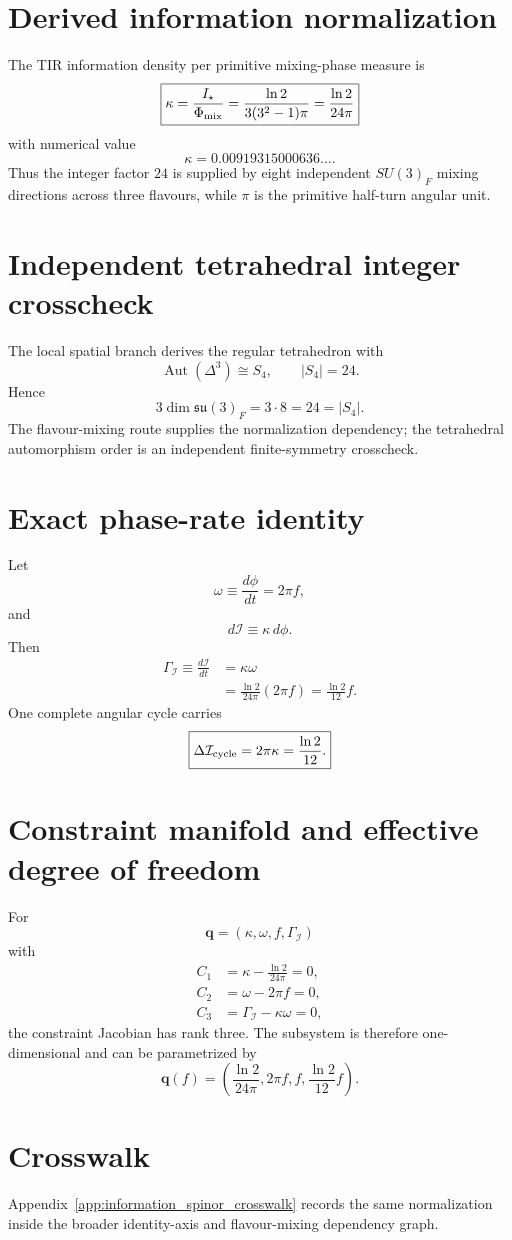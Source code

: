 \section{Derived information normalization}
The TIR information density per primitive mixing-phase measure is
\[
\boxed{
\kappa
=\frac{I_\star}{\Phi_{\rm mix}}
=\frac{\ln2}{3(3^2-1)\pi}
=\frac{\ln2}{24\pi}
}
\]
with numerical value
\[
\kappa=0.00919315000636\ldots .
\]
Thus the integer factor $24$ is supplied by eight independent $SU(3)_F$ mixing
directions across three flavours, while $\pi$ is the primitive half-turn angular
unit.

\section{Independent tetrahedral integer crosscheck}
The local spatial branch derives the regular tetrahedron with
\[
\operatorname{Aut}(\Delta^3)\cong S_4,
\qquad
|S_4|=24.
\]
Hence
\[
\boxed{
3\dim\mathfrak{su}(3)_F
=3\cdot8
=24
=|S_4|.
}
\]
The flavour-mixing route supplies the normalization dependency; the tetrahedral
automorphism order is an independent finite-symmetry crosscheck.

\section{Exact phase-rate identity}
\label{app:kappa-phase-rate}
Let
\begin{equation}
\omega\equiv\frac{d\phi}{dt}=2\pi f,
\label{eq:kappa-omega-frequency}
\end{equation}
and
\begin{equation}
d\mathcal I\equiv\kappa\,d\phi.
\label{eq:kappa-information-phase-increment}
\end{equation}
Then
\begin{align}
\Gamma_{\mathcal I}
\equiv\frac{d\mathcal I}{dt}
&=\kappa\omega\\
&=\frac{\ln2}{24\pi}(2\pi f)
=\boxed{\frac{\ln2}{12}f}.
\label{eq:kappa-phase-refresh-identity}
\end{align}
One complete angular cycle carries
\begin{equation}
\boxed{
\Delta\mathcal I_{\rm cycle}
=2\pi\kappa
=\frac{\ln2}{12}.
}
\label{eq:kappa-information-per-cycle}
\end{equation}

\section{Constraint manifold and effective degree of freedom}
\label{app:kappa-constraint-manifold}
For
\[
\mathbf q=(\kappa,\omega,f,\Gamma_{\mathcal I})
\]
with
\begin{align}
C_1&=\kappa-\frac{\ln2}{24\pi}=0,\\
C_2&=\omega-2\pi f=0,\\
C_3&=\Gamma_{\mathcal I}-\kappa\omega=0,
\end{align}
the constraint Jacobian has rank three. The subsystem is therefore
one-dimensional and can be parametrized by
\[
\boxed{
\mathbf q(f)=
\left(
\frac{\ln2}{24\pi},
2\pi f,
f,
\frac{\ln2}{12}f
\right).
}
\]

\section{Crosswalk}
Appendix~\ref{app:information_spinor_crosswalk} records the same normalization
inside the broader identity-axis and flavour-mixing dependency graph.
